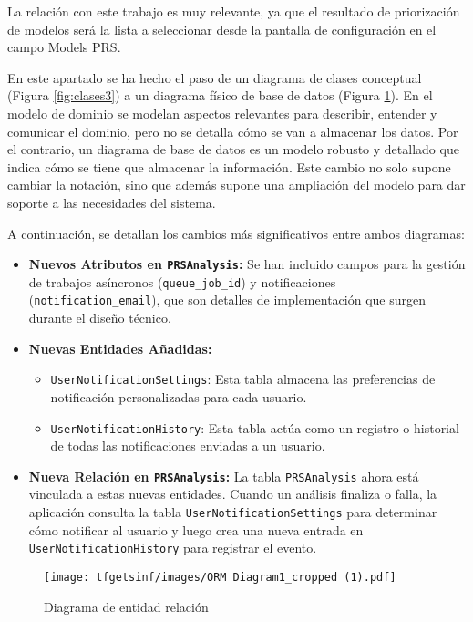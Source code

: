 La relación con este trabajo es muy relevante, ya que el resultado de priorización de modelos será la lista a seleccionar desde la pantalla de configuración en el campo Models PRS.

En este apartado se ha hecho el paso de un diagrama de clases conceptual (Figura \ref{fig:clases3}) a un diagrama físico de base de datos (Figura \ref{fig:bd}). En el modelo de dominio se modelan aspectos relevantes para describir, entender y comunicar el dominio, pero no se detalla cómo se van a almacenar los datos. Por el contrario, un diagrama de base de datos es un modelo robusto y detallado que indica cómo se tiene que almacenar la información. Este cambio no solo supone cambiar la notación, sino que además supone una ampliación del modelo para dar soporte a las necesidades del sistema.

A continuación, se detallan los cambios más significativos entre ambos diagramas: 

\begin{itemize}
    \item \textbf{Nuevos Atributos en \texttt{PRSAnalysis}:} Se han incluido campos para la gestión de trabajos asíncronos (\texttt{queue\_job\_id}) y notificaciones (\texttt{notification\_email}), que son detalles de implementación que surgen durante el diseño técnico.
    \item \textbf{Nuevas Entidades Añadidas:}
    \begin{itemize}
        \item \texttt{UserNotificationSettings}: Esta tabla almacena las preferencias de notificación personalizadas para cada usuario.
        \item \texttt{UserNotificationHistory}: Esta tabla actúa como un registro o historial de todas las notificaciones enviadas a un usuario.
    \end{itemize}
    \item \textbf{Nueva Relación en \texttt{PRSAnalysis}:}
    La tabla \texttt{PRSAnalysis} ahora está vinculada a estas nuevas entidades. Cuando un análisis finaliza o falla, la aplicación consulta la tabla \texttt{UserNotificationSettings} para determinar cómo notificar al usuario y luego crea una nueva entrada en \texttt{UserNotificationHistory} para registrar el evento.
\end{itemize}

\begin{figure}[H]
    \centering
    \texttt{[image: tfgetsinf/images/ORM Diagram1\_cropped (1).pdf]}
    \caption{Diagrama de entidad relación}
    \label{fig:bd}
\end{figure}


